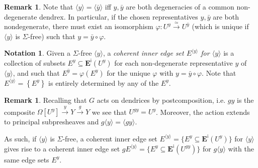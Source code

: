 \documentclass[a4paper,10pt]{article}%
\numberwithin{equation}{section}
\numberwithin{figure}{section}
\theoremstyle{definition} %
\newtheorem{remark}[equation]{Remark}%
\newtheorem{notation}[equation]{Notation}%
\newcommand{\1}{\ensuremath{\mathbbm 1}}%
\begin{document}
\begin{remark}
	Note that
	$\langle y \rangle = \langle \bar{y} \rangle$
	iff $y,\bar{y}$ are both degeneracies of a common non-degenerate dendrex.
	In particular, if the chosen representatives $y,\bar{y}$ are both nondegenerate,
	there must exist an isomorphism
	$\varphi \colon U^y \xrightarrow{\simeq} U^{\bar{y}}$
	(which is unique if 
	$\langle y \rangle$ is $\Sigma$-free)
	such that $y= \bar{y} \circ \varphi$.
\end{remark}



\begin{notation}
	Given a $\Sigma$-free $\langle y \rangle$,
	a \emph{coherent inner edge set $E^{\langle y \rangle}$ for $\langle y \rangle$}
	is a collection of subsets 
	$E^y \subseteq \boldsymbol{E}^{\mathsf{i}}(U^y)$
	for each non-degenerate representative $y$ of $\langle y \rangle$, and such that 
	$E^{\bar{y}}  = \varphi \left(E^y \right)$
	for the unique $\varphi$ with $y= \bar{y} \circ \varphi$.
	Note that $E^{\langle y \rangle} = \left\{E^y \right\}$
	is entirely determined by any of the $E^y$.
\end{notation}


\begin{remark}
	Recalling that $G$ acts on dendrices by postcomposition, i.e.
	$gy$ is the composite
	$\Omega[U^y] \xrightarrow{y} Y \xrightarrow{g} Y$
	we see that $U^{gy} = U^{y}$.
	Moreover, the action extends to principal subpresheaves and
	$g \langle y \rangle = \langle g y \rangle$.
	
	As such, if $\langle y\rangle$ is $\Sigma$-free, a coherent inner edge set 
	$E^{\langle y \rangle} = \{E^y \subseteq \boldsymbol{E}^{\mathsf{i}}(U^y)\}$
	for $\langle y \rangle$
	gives rise to a coherent inner edge set 
	$g E^{\langle y \rangle} = \{E^y \subseteq \boldsymbol{E}^{\mathsf{i}}(U^{gy})\}$
	for $g\langle y \rangle$
	with the same edge sets $E^y$.
\end{remark}
\end{document}
